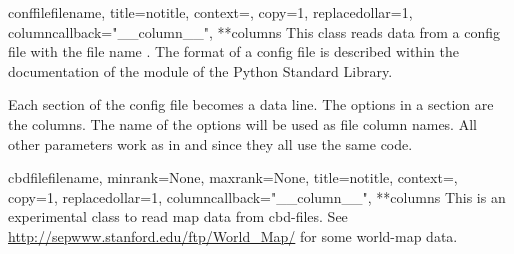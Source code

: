 \begin{classdesc}{conffile}{filename, title=notitle, context={}, copy=1, %
                            replacedollar=1, columncallback="\_\_column\_\_", **columns}
  This class reads data from a config file with the file name
  . The format of a config file is described within the
  documentation of the  module of the Python
  Standard Library.

  Each section of the config file becomes a data line. The options in
  a section are the columns. The name of the options will be used as
  file column names. All other parameters work as in
   and  since they all use
  the same code.
\end{classdesc} %

\begin{classdesc}{cbdfile}{filename, minrank=None, maxrank=None, %
                           title=notitle, context={}, copy=1,
                           replacedollar=1, columncallback="\_\_column\_\_", **columns}
  This is an experimental class to read map data from cbd-files. See
  \url{http://sepwww.stanford.edu/ftp/World_Map/} for some world-map
  data.
\end{classdesc} %


